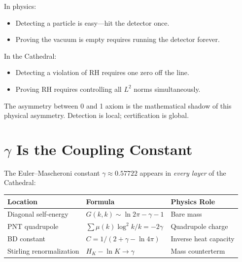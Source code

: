 \documentclass[11pt,a4paper]{article}
\begin{document}
\begin{observation}
In physics:
\begin{itemize}
  \item Detecting a particle is easy---hit the detector once.
  \item Proving the vacuum is empty requires running the detector
    forever.
\end{itemize}
In the Cathedral:
\begin{itemize}
  \item Detecting a violation of RH requires one zero off the line.
  \item Proving RH requires controlling all $L^2$ norms simultaneously.
\end{itemize}
The asymmetry between 0 and 1 axiom is the mathematical shadow of
this physical asymmetry. Detection is local; certification is global.
\end{observation}

\section{$\gamma$ Is the Coupling Constant}
\label{sec:gamma}

The Euler--Mascheroni constant $\gamma \approx 0.57722$ appears in
\emph{every layer} of the Cathedral:

\begin{center}
\begin{tabular}{@{}lll@{}}
\toprule
\textbf{Location} & \textbf{Formula} & \textbf{Physics Role} \\
\midrule
Diagonal self-energy & $G(k,k) \sim \ln 2\pi - \gamma - 1$
  & Bare mass \\
PNT quadrupole & $\sum \mu(k)\log^2 k / k = -2\gamma$
  & Quadrupole charge \\
BD constant & $C = 1/(2 + \gamma - \ln 4\pi)$
  & Inverse heat capacity \\
Stirling renormalization & $H_K - \ln K \to \gamma$
  & Mass counterterm \\
\bottomrule
\end{tabular}
\end{center}
\end{document}

